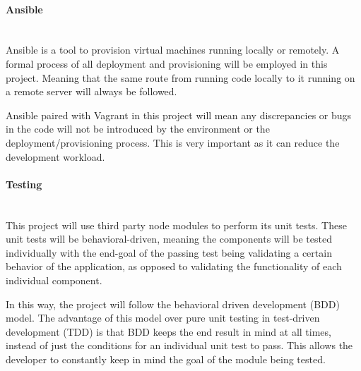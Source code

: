 \documentclass{article}
\begin{document}
\paragraph{Ansible}\mbox{}\\
Ansible is a tool to provision virtual machines running locally or remotely. A formal process of all deployment and provisioning will be employed in this project. Meaning that the same route from running code locally to it running on a remote server will always be followed.

Ansible paired with Vagrant in this project will mean any discrepancies or bugs in the code will not be introduced by the environment or the deployment/provisioning process. This is very important as it can reduce the development workload. 

\paragraph{Testing}\mbox{}\\
This project will use third party node modules to perform its unit tests. These unit tests will be behavioral-driven, meaning the components will be tested individually with the end-goal of the passing test being validating a certain behavior of the application, as opposed to validating the functionality of each individual component.

In this way, the project will follow the behavioral driven development (BDD) model. The advantage of this model over pure unit testing in test-driven development (TDD) is that BDD keeps the end result in mind at all times, instead of just the conditions for an individual unit test to pass. This allows the developer to constantly keep in mind the goal of the module being tested.


\newpage

\end{document}
